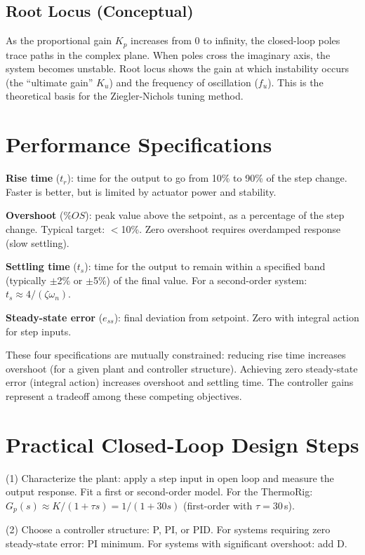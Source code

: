 \documentclass[11pt,letterpaper,twoside,openany]{book}
\begin{document}
\subsection{Root Locus (Conceptual)}
As the proportional gain $K_p$ increases from 0 to infinity, the closed-loop poles trace paths in the complex plane. When poles cross the imaginary axis, the system becomes unstable. Root locus shows the gain at which instability occurs (the ``ultimate gain'' $K_u$) and the frequency of oscillation ($f_u$). This is the theoretical basis for the Ziegler-Nichols tuning method.

\section{Performance Specifications}
\textbf{Rise time} ($t_r$): time for the output to go from 10\% to 90\% of the step change. Faster is better, but is limited by actuator power and stability.

\textbf{Overshoot} ($\%OS$): peak value above the setpoint, as a percentage of the step change. Typical target: $<$10\%. Zero overshoot requires overdamped response (slow settling).

\textbf{Settling time} ($t_s$): time for the output to remain within a specified band (typically $\pm$2\% or $\pm$5\%) of the final value. For a second-order system: $t_s \approx 4/(\zeta \omega_n)$.

\textbf{Steady-state error} ($e_{ss}$): final deviation from setpoint. Zero with integral action for step inputs.

These four specifications are mutually constrained: reducing rise time increases overshoot (for a given plant and controller structure). Achieving zero steady-state error (integral action) increases overshoot and settling time. The controller gains represent a tradeoff among these competing objectives.

\section{Practical Closed-Loop Design Steps}
(1) Characterize the plant: apply a step input in open loop and measure the output response. Fit a first or second-order model. For the ThermoRig: $G_p(s) \approx K/(1+\tau s) = 1/(1+30s)$ (first-order with $\tau = 30$\,s).

(2) Choose a controller structure: P, PI, or PID. For systems requiring zero steady-state error: PI minimum. For systems with significant overshoot: add D.
\end{document}
